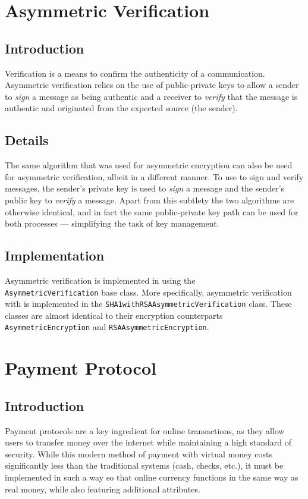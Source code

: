 \documentclass[a4paper,11pt]{article}
\begin{document}
\section{Asymmetric Verification}

\subsection{Introduction}
Verification is a means to confirm the authenticity of a communication. 
Asymmetric verification relies on the use of public-private keys to allow a 
sender to \emph{sign} a message as being authentic and a receiver to
\emph{verify} that the message is authentic and originated from the expected 
source (the sender).

\subsection{Details}
The same  algorithm that was used for asymmetric encryption can 
also be used for asymmetric verification, albeit in a different manner. To use 
 to sign and verify messages, the sender's private key is used 
to \emph{sign} a message and the sender's public key to \emph{verify} a message.
Apart from this subtlety the two algorithms are otherwise identical, and in fact
the same public-private key path can be used for both processes --- simplifying 
the task of key management.

\subsection{Implementation}
Asymmetric verification is implemented in \packageName{} using the \\
\verb+AsymmetricVerification+ base class. More specifically, asymmetric 
verification with  is implemented in the 
\verb+SHA1withRSAAsymmetricVerification+ class. These classes are almost 
identical to their encryption counterparts \verb+AsymmetricEncryption+ and 
\verb+RSAAsymmetricEncryption+.

\section{Payment Protocol}

\subsection{Introduction}
Payment protocols are a key ingredient for online transactions, as they allow 
users to transfer money over the internet while maintaining a high standard of 
security. While this modern method of payment with virtual money costs 
significantly less than the traditional systems (cash, checks, etc.), it must be
implemented in such a way so that online currency functions in the same way as 
real money, while also featuring additional attributes.
\end{document}
